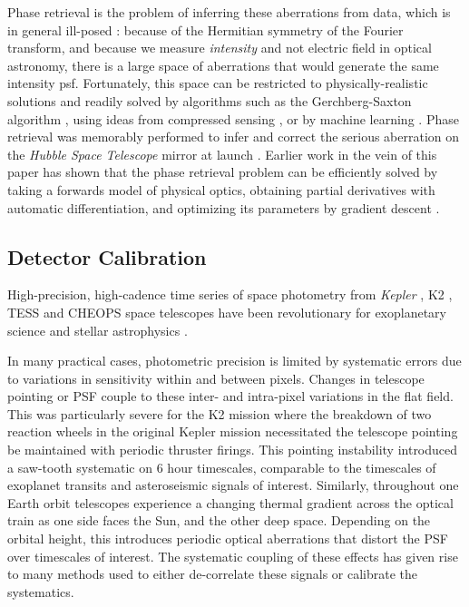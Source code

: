 \documentclass[twocolumn]{spie}
\begin{document}
Phase retrieval is the problem of inferring these aberrations from data\cite{schechtman2014}, which is in general ill-posed \cite{barnett2020}: because of the Hermitian symmetry of the Fourier transform, and because we measure \textit{intensity} and not electric field in optical astronomy, there is a large space of aberrations that would generate the same intensity \ac{psf}. Fortunately, this space can be restricted to physically-realistic solutions and readily solved by algorithms such as the Gerchberg-Saxton algorithm \cite{gerchberg1972}, using ideas from compressed sensing \cite{candes2011}, or by machine learning \cite{metzler2018,isil2019,nishizaki2020}.  Phase retrieval was memorably performed to infer and correct the serious aberration on the \textit{Hubble Space Telescope} mirror at launch \cite{hubble_phase_ret}. 
Earlier work in the vein of this paper has shown that the phase retrieval problem can be efficiently solved by taking a forwards model of physical optics, obtaining partial derivatives with automatic differentiation, and optimizing its parameters by gradient descent \cite{jurling_fienup,phase_ret_and_design}.

\subsection{Detector Calibration}

High-precision, high-cadence time series of space photometry from \textit{Kepler} \cite{Borucki2010}, K2 \cite{K2}, TESS \cite{TESS} and CHEOPS \cite{CHEOPS} space telescopes have been revolutionary for exoplanetary science \cite{Zhu2021} and stellar astrophysics \cite{Aerts21,Jackiewicz2021}. 

In many practical cases, photometric precision is limited by systematic errors due to variations in sensitivity within and between pixels. Changes in telescope pointing or PSF couple to these inter- and intra-pixel variations in the flat field. This was particularly severe for the K2 mission where the breakdown of two reaction wheels in the original Kepler mission necessitated the telescope pointing be maintained with periodic thruster firings. This pointing instability introduced a saw-tooth systematic on 6 hour timescales, comparable to the timescales of exoplanet transits and asteroseismic signals of interest. Similarly, throughout one Earth orbit telescopes experience a changing thermal gradient across the optical train as one side faces the Sun, and the other deep space. Depending on the orbital height, this introduces periodic optical aberrations that distort the PSF over timescales of interest. The systematic coupling of these effects has given rise to many methods used to either de-correlate these signals or calibrate the systematics. 
\end{document}

